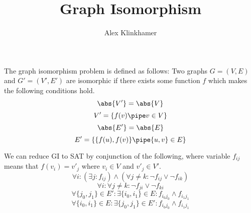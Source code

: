 



\title{Graph Isomorphism}
\author{Alex Klinkhamer}
\maketitle

The graph isomorphism problem is defined as follows:
Two graphs $G=(V,E)$ and $G'=(V',E')$ are isomorphic if there exists some function $f$ which makes the following conditions hold.
\[\abs{V'}=\abs{V}\]
\[V'=\{f(v)\pipe v\in V\}\]
\[\abs{E'}=\abs{E}\]
\[E'=\{\{f(u),f(v)\}\pipe \{u,v\}\in E\}\]

We can reduce GI to SAT by conjunction of the following, where variable $f_{ij}$ means that $f(v_i)=v'_j$ where $v_i \in V$ and $v'_j \in V'$.
\[\forall i : (\exists j : f_{ij}) \wedge (\forall j \ne k: \neg f_{ij} \vee \neg f_{ik})\]
\[\forall i : \forall j \ne k : \neg f_{ji} \vee \neg f_{ki}\]
\[\forall \{j_0,j_1\} \in E' : \exists \{i_0,i_1\}\in E : f_{i_0 j_0} \wedge f_{i_1 j_1}\]
\[\forall \{i_0,i_1\} \in E : \exists \{j_0, j_1\} \in E' : f_{i_0 j_0} \wedge f_{i_1 j_1}\]



